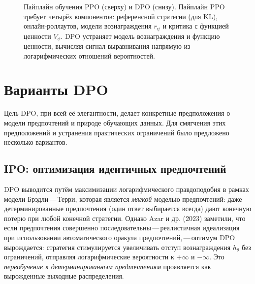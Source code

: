 \begin{figure}[ht]
{%
}
\caption{Пайплайн обучения PPO (сверху) и DPO (снизу). Пайплайн PPO требует четырёх компонентов: референсной стратегии (для KL), онлайн-роллаутов, модели вознаграждения $r_\psi$ и критика с функцией ценности $V_\phi$. DPO устраняет модель вознаграждения и функцию ценности, вычисляя сигнал выравнивания напрямую из логарифмических отношений вероятностей.}
\label{fig:dpo-vs-ppo}
\end{figure}

\section{Варианты DPO}
\label{sec:dpo-variants}

Цель DPO, при всей её элегантности, делает конкретные предположения о модели предпочтений и природе обучающих данных. Для смягчения этих предположений и устранения практических ограничений было предложено несколько вариантов.

\subsection{IPO: оптимизация идентичных предпочтений}

DPO выводится путём максимизации логарифмического правдоподобия в рамках модели Брэдли\,---\,Терри, которая является \emph{мягкой} моделью предпочтений: даже детерминированные предпочтения (один ответ выбирается всегда) дают конечную потерю при любой конечной стратегии. Однако Azar и др. (2023) заметили, что если предпочтения совершенно последовательны\,---\,реалистичная идеализация при использовании автоматического оракула предпочтений,\,---\,оптимум DPO вырождается: стратегия стимулируется увеличивать отступ вознаграждения $h_\theta$ без ограничений, отправляя логарифмические вероятности к $+\infty$ и $-\infty$. Это \emph{переобучение к детерминированным предпочтениям} проявляется как вырожденные выходные распределения.

